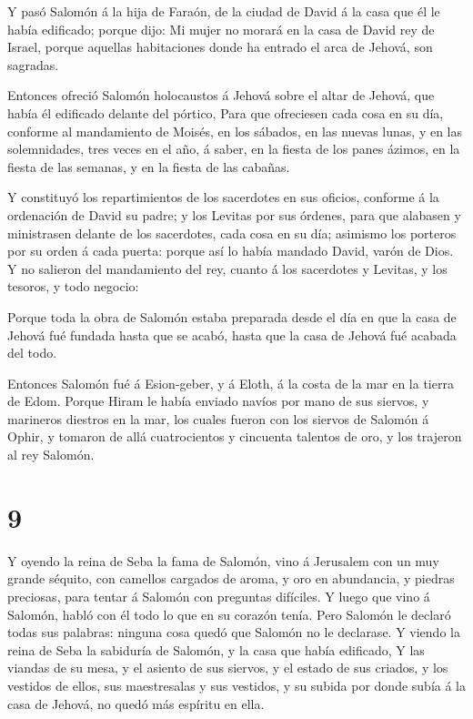  Y pasó Salomón á la hija de Faraón, de la ciudad de David
á la casa que él le había edificado; porque dijo: Mi mujer no morará en
la casa de David rey de Israel, porque aquellas habitaciones donde ha
entrado el arca de Jehová, son sagradas.

 Entonces ofreció Salomón holocaustos á Jehová sobre el
altar de Jehová, que había él edificado delante del pórtico,
 Para que ofreciesen cada cosa en su día, conforme al
mandamiento de Moisés, en los sábados, en las nuevas lunas, y en las
solemnidades, tres veces en el año, á saber, en la fiesta de los panes
ázimos, en la fiesta de las semanas, y en la fiesta de las cabañas.

 Y constituyó los repartimientos de los sacerdotes en sus
oficios, conforme á la ordenación de David su padre; y los Levitas por
sus órdenes, para que alabasen y ministrasen delante de los sacerdotes,
cada cosa en su día; asimismo los porteros por su orden á cada puerta:
porque así lo había mandado David, varón de Dios.  Y no
salieron del mandamiento del rey, cuanto á los sacerdotes y Levitas, y
los tesoros, y todo negocio:

 Porque toda la obra de Salomón estaba preparada desde el
día en que la casa de Jehová fué fundada hasta que se acabó, hasta que
la casa de Jehová fué acabada del todo.

 Entonces Salomón fué á Esion-geber, y á Eloth, á la costa
de la mar en la tierra de Edom.  Porque Hiram le había
enviado navíos por mano de sus siervos, y marineros diestros en la mar,
los cuales fueron con los siervos de Salomón á Ophir, y tomaron de allá
cuatrocientos y cincuenta talentos de oro, y los trajeron al rey
Salomón.

\hypertarget{section-8}{%
\section{9}\label{section-8}}

 Y oyendo la reina de Seba la fama de Salomón, vino á
Jerusalem con un muy grande séquito, con camellos cargados de aroma, y
oro en abundancia, y piedras preciosas, para tentar á Salomón con
preguntas difíciles. Y luego que vino á Salomón, habló con él todo lo
que en su corazón tenía.  Pero Salomón le declaró todas sus
palabras: ninguna cosa quedó que Salomón no le declarase.  Y
viendo la reina de Seba la sabiduría de Salomón, y la casa que había
edificado,  Y las viandas de su mesa, y el asiento de sus
siervos, y el estado de sus criados, y los vestidos de ellos, sus
maestresalas y sus vestidos, y su subida por donde subía á la casa de
Jehová, no quedó más espíritu en ella.

